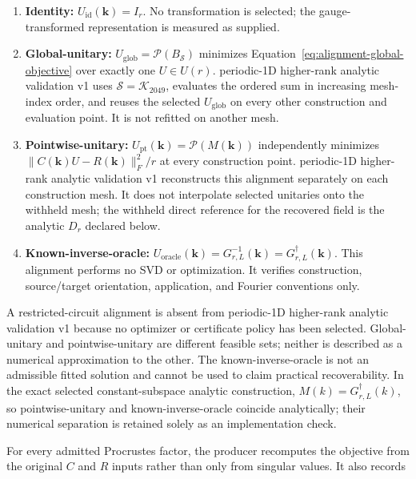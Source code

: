 \documentclass[11pt]{article}
\begin{document}
\begin{enumerate}
\item \textbf{Identity:}
$U_{\mathrm{id}}(\mathbf k)=I_r$. No transformation is selected; the gauge-transformed representation is
measured as supplied.

\item \textbf{Global-unitary:}
$U_{\mathrm{glob}}=\mathcal P(B_{\mathcal S})$ minimizes
Equation~\eqref{eq:alignment-global-objective} over exactly one $U\in U(r)$. periodic-1D higher-rank analytic validation v1 uses
$\mathcal S=\mathcal K_{2049}$, evaluates the ordered sum in increasing mesh-index order,
and reuses the selected $U_{\mathrm{glob}}$ on every other construction and evaluation point. It
is not refitted on another mesh.

\item \textbf{Pointwise-unitary:}
$U_{\mathrm{pt}}(\mathbf k)=\mathcal P(M(\mathbf k))$ independently minimizes
$\lVert C(\mathbf k)U-R(\mathbf k)\rVert_F^2/r$ at every construction point. periodic-1D higher-rank analytic validation v1
reconstructs this alignment separately on each construction mesh. It does not interpolate selected
unitaries onto the withheld mesh; the withheld direct reference for the recovered field
is the analytic $D_r$ declared below.

\item \textbf{Known-inverse-oracle:}
$U_{\mathrm{oracle}}(\mathbf k)=G_{r,L}^{-1}(\mathbf k)=G_{r,L}^\dagger(\mathbf k)$. This alignment performs no
SVD or optimization. It verifies construction, source/target orientation, application,
and Fourier conventions only.

\end{enumerate}

A restricted-circuit alignment is absent from periodic-1D higher-rank analytic validation v1 because no optimizer or certificate
policy has been selected. Global-unitary and pointwise-unitary are different feasible
sets; neither is described as a numerical approximation to the other. The
known-inverse-oracle is not an admissible fitted solution and cannot
be used to claim practical recoverability. In the exact selected constant-subspace analytic construction,
$M(k)=G_{r,L}^\dagger(k)$, so pointwise-unitary and known-inverse-oracle coincide analytically; their numerical separation
is retained solely as an implementation check.

For every admitted Procrustes factor, the producer recomputes the objective from the
original $C$ and $R$ inputs rather than only from singular values. It also records
\end{document}
